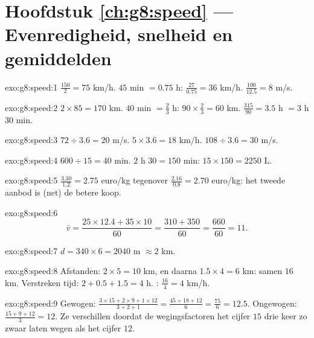\section*{Hoofdstuk \ref{ch:g8:speed} --- Evenredigheid, snelheid en gemiddelden}

\begin{solution}{exo:g8:speed:1}
$\frac{150}{2} = 75$ km/h. \quad
$45$ min $= 0.75$ h: $\frac{27}{0.75} = 36$ km/h. \quad
$\frac{100}{12.5} = 8$ m/s.
\end{solution}

\begin{solution}{exo:g8:speed:2}
$2 \times 85 = 170$ km. \quad
$40$ min $= \frac23$ h: $90 \times \frac23 = 60$ km. \quad
$\frac{315}{90} = 3.5$ h $= 3$ h $30$ min.
\end{solution}

\begin{solution}{exo:g8:speed:3}
$72 \div 3.6 = 20$ m/s. \quad
$5 \times 3.6 = 18$ km/h. \quad
$108 \div 3.6 = 30$ m/s.
\end{solution}

\begin{solution}{exo:g8:speed:4}
$600 \div 15 = 40$ min. \quad
$2$ h $30 = 150$ min: $15 \times 150 = 2250$ L.
\end{solution}

\begin{solution}{exo:g8:speed:5}
$\frac{3.30}{1.2} = 2.75$ euro/kg tegenover $\frac{2.16}{0.8} = 2.70$ euro/kg:
het tweede aanbod is (net) de betere koop.
\end{solution}

\begin{solution}{exo:g8:speed:6}
\[
\bar v = \frac{25 \times 12.4 + 35 \times 10}{60}
= \frac{310 + 350}{60} = \frac{660}{60} = 11 .
\]
\end{solution}

\begin{solution}{exo:g8:speed:7}
$d = 340 \times 6 = 2040$ m $\approx 2$ km.
\end{solution}

\begin{solution}{exo:g8:speed:8}
Afstanden: $2 \times 5 = 10$ km, en daarna $1.5 \times 4 = 6$ km: samen $16$ km.
Verstreken tijd: $2 + 0.5 + 1.5 = 4$ h. :
$\frac{16}{4} = 4$ km/h.
\end{solution}

\begin{solution}{exo:g8:speed:9}
Gewogen:
$\frac{3 \times 15 + 2 \times 9 + 1 \times 12}{3 + 2 + 1}
= \frac{45 + 18 + 12}{6} = \frac{75}{6} = 12.5$.
Ongewogen: $\frac{15 + 9 + 12}{3} = 12$. Ze verschillen doordat de
wegingsfactoren het cijfer $15$ drie keer zo zwaar laten wegen als het cijfer
$12$.
\end{solution}

